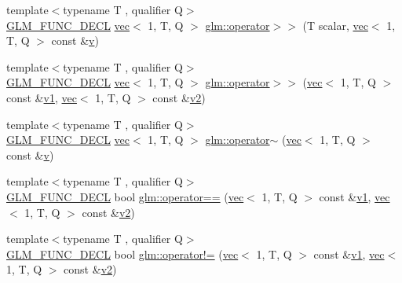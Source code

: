 \begin{DoxyCompactItemize}
\item 
{\footnotesize template$<$typename T , qualifier Q$>$ }\\\hyperlink{setup_8hpp_ab2d052de21a70539923e9bcbf6e83a51}{G\+L\+M\+\_\+\+F\+U\+N\+C\+\_\+\+D\+E\+CL} \hyperlink{structglm_1_1vec}{vec}$<$ 1, T, Q $>$ \hyperlink{group__ext__vec1_ga41efbda33c026dd25484c09e211eb68e}{glm\+::operator$>$$>$} (T scalar, \hyperlink{structglm_1_1vec}{vec}$<$ 1, T, Q $>$ const \&\hyperlink{_s_d_l__opengl_8h_a10a82eabcb59d2fcd74acee063775f90}{v})
\item 
{\footnotesize template$<$typename T , qualifier Q$>$ }\\\hyperlink{setup_8hpp_ab2d052de21a70539923e9bcbf6e83a51}{G\+L\+M\+\_\+\+F\+U\+N\+C\+\_\+\+D\+E\+CL} \hyperlink{structglm_1_1vec}{vec}$<$ 1, T, Q $>$ \hyperlink{group__ext__vec1_gaf53e1d5cb9aa5de1b2a77bf40c275361}{glm\+::operator$>$$>$} (\hyperlink{structglm_1_1vec}{vec}$<$ 1, T, Q $>$ const \&\hyperlink{_s_d_l__opengl__glext_8h_a435c176a02c061b43e19bdf7c86cceae}{v1}, \hyperlink{structglm_1_1vec}{vec}$<$ 1, T, Q $>$ const \&\hyperlink{_s_d_l__opengl__glext_8h_a0928f6d0f0f794ba000a21dfae422136}{v2})
\item 
{\footnotesize template$<$typename T , qualifier Q$>$ }\\\hyperlink{setup_8hpp_ab2d052de21a70539923e9bcbf6e83a51}{G\+L\+M\+\_\+\+F\+U\+N\+C\+\_\+\+D\+E\+CL} \hyperlink{structglm_1_1vec}{vec}$<$ 1, T, Q $>$ \hyperlink{group__ext__vec1_ga923256ef3abbc940c475ddb5e2bca75b}{glm\+::operator$\sim$} (\hyperlink{structglm_1_1vec}{vec}$<$ 1, T, Q $>$ const \&\hyperlink{_s_d_l__opengl_8h_a10a82eabcb59d2fcd74acee063775f90}{v})
\item 
{\footnotesize template$<$typename T , qualifier Q$>$ }\\\hyperlink{setup_8hpp_ab2d052de21a70539923e9bcbf6e83a51}{G\+L\+M\+\_\+\+F\+U\+N\+C\+\_\+\+D\+E\+CL} bool \hyperlink{group__ext__vec1_gaa9cd0f18629236bade24765fd5d2616b}{glm\+::operator==} (\hyperlink{structglm_1_1vec}{vec}$<$ 1, T, Q $>$ const \&\hyperlink{_s_d_l__opengl__glext_8h_a435c176a02c061b43e19bdf7c86cceae}{v1}, \hyperlink{structglm_1_1vec}{vec}$<$ 1, T, Q $>$ const \&\hyperlink{_s_d_l__opengl__glext_8h_a0928f6d0f0f794ba000a21dfae422136}{v2})
\item 
{\footnotesize template$<$typename T , qualifier Q$>$ }\\\hyperlink{setup_8hpp_ab2d052de21a70539923e9bcbf6e83a51}{G\+L\+M\+\_\+\+F\+U\+N\+C\+\_\+\+D\+E\+CL} bool \hyperlink{group__ext__vec1_gadc81ac3efb2cc1678cb7ebe126d2e26d}{glm\+::operator!=} (\hyperlink{structglm_1_1vec}{vec}$<$ 1, T, Q $>$ const \&\hyperlink{_s_d_l__opengl__glext_8h_a435c176a02c061b43e19bdf7c86cceae}{v1}, \hyperlink{structglm_1_1vec}{vec}$<$ 1, T, Q $>$ const \&\hyperlink{_s_d_l__opengl__glext_8h_a0928f6d0f0f794ba000a21dfae422136}{v2})

\end{DoxyCompactItemize}
